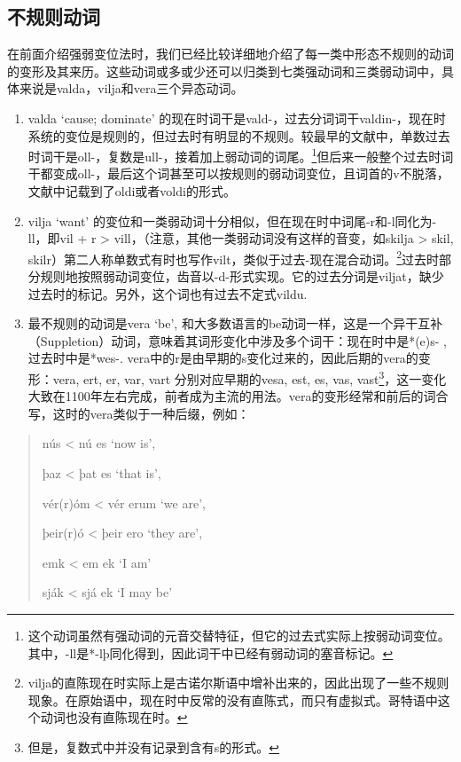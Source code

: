 \subsection{不规则动词}\label{ux4e0dux89c4ux5219ux52a8ux8bcd}

在前面介绍强弱变位法时，我们已经比较详细地介绍了每一类中形态不规则的动词的变形及其来历。这些动词或多或少还可以归类到七类强动词和三类弱动词中，具体来说是valda，vilja和vera三个异态动词。

\begin{enumerate}
  \def\labelenumi{\arabic{enumi}.}
  \item
        valda `cause; dominate‌'
        的现在时词干是vald-，过去分词词干valdin-，现在时系统的变位是规则的，但过去时有明显的不规则。较最早的文献中，单数过去时词干是oll-，复数是ull-，接着加上弱动词的词尾。\footnote{这个动词虽然有强动词的元音交替特征，但它的过去式实际上按弱动词变位。其中，-ll是*-lþ同化得到，因此词干中已经有弱动词的塞音标记。}但后来一般整个过去时词干都变成oll-，最后这个词甚至可以按规则的弱动词变位，且词首的v不脱落，文献中记载到了oldi或者voldi的形式。
  \item
        vilja `want‌'
        的变位和一类弱动词十分相似，但在现在时中词尾-r和-l同化为-ll，即vil + r
        \textgreater{} vill，（注意，其他一类弱动词没有这样的音变，如skilja
        \textgreater{} skil,
        skilr）第二人称单数式有时也写作vilt，类似于过去-现在混合动词。\footnote{vilja的直陈现在时实际上是古诺尔斯语中增补出来的，因此出现了一些不规则现象。在原始语中，现在时中反常的没有直陈式，而只有虚拟式。哥特语中这个动词也没有直陈现在时。}过去时部分规则地按照弱动词变位，齿音以-d-形式实现。它的过去分词是viljat，缺少过去时的标记。另外，这个词也有过去不定式vildu.
  \item
        最不规则的动词是vera `be‌',
        和大多数语言的be动词一样，这是一个异干互补（Suppletion）动词，意味着其词形变化中涉及多个词干：现在时中是*(e)s-
        , 过去时中是*wes-.
        vera中的r是由早期的s变化过来的，因此后期的vera的变形：vera, ert, er,
        var, vart 分别对应早期的vesa, est, es, vas,
        vast\footnote{但是，复数式中并没有记录到含有s的形式。}，这一变化大致在1100年左右完成，前者成为主流的用法。vera的变形经常和前后的词合写，这时的vera类似于一种后缀，例如：
\end{enumerate}

\begin{quote}
  nús \textless{} nú es `now is‌',

  þaz \textless{} þat es `that is‌',

  vér(r)óm \textless{} vér erum `we are‌',

  þeir(r)ó \textless{} þeir ero `they are‌',

  emk \textless{} em ek `I am'

  sják \textless{} sjá ek `I may be'
\end{quote}


